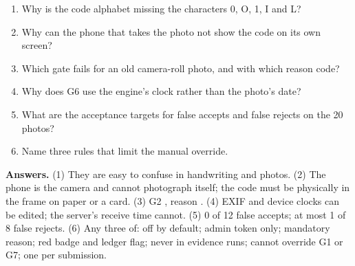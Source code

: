 \begin{quizbox}
\begin{enumerate}
  \item Why is the code alphabet missing the characters 0, O, 1, I and L?
  \item Why can the phone that takes the photo not show the code on its own screen?
  \item Which gate fails for an old camera-roll photo, and with which reason code?
  \item Why does G6 use the engine's clock rather than the photo's date?
  \item What are the acceptance targets for false accepts and false rejects on the 20 photos?
  \item Name three rules that limit the manual override.
\end{enumerate}
{\small\color{cGrey}\textbf{Answers.}
(1) They are easy to confuse in handwriting and photos.
(2) The phone is the camera and cannot photograph itself; the code must be physically in the frame on paper or a card.
(3) G2 , reason .
(4) EXIF and device clocks can be edited; the server's receive time cannot.
(5) 0 of 12 false accepts; at most 1 of 8 false rejects.
(6) Any three of: off by default; admin token only; mandatory reason; red badge and ledger flag; never in evidence runs; cannot override G1 or G7; one per submission.}
\end{quizbox}
